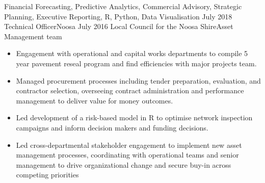 \begin{experiences}
{\begin{itemize}
                      \end{itemize}
                    }
                    {Financial Forecasting, Predictive Analytics, Commercial Advisory, Strategic Planning, Executive Reporting, R, Python, Data Visualisation}
  \emptySeparator
  \consultantexperience
    {July 2018} {Technical Officer}{}{Noosa}
    {July 2016}   {Local Council for the Noosa Shire}{Asset Management team}
      {
                      \begin{itemize}
		\item Engagement with operational and capital works departments to compile 5 year pavement reseal program and find efficiencies with major projects team.
		\item Managed procurement processes including tender preparation, evaluation, and contractor selection, overseeing contract administration and performance management to deliver value for money outcomes.
		\item Led development of a risk-based model in R to optimise network inspection campaigns and inform decision makers and funding decisions.
		\item Led cross-departmental stakeholder engagement to implement new asset management processes, coordinating with operational teams and senior management to drive organizational change and secure buy-in across competing priorities
		

\end{itemize}}
\end{experiences}
